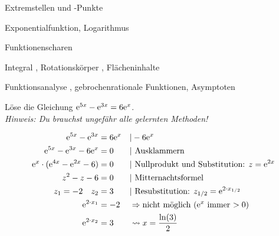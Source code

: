 


\begin{inhalt}
	\item Extremstellen und -Punkte 
	\item Exponentialfunktion, Logarithmus 
	\item Funktionenscharen 
  \item Integral , Rotationskörper , Flächeninhalte 
	\item Funktionsanalyse , gebrochenrationale Funktionen, Asymptoten 
\end{inhalt}

Löse die Gleichung $\mathrm{e}^{5x}-\mathrm{e}^{3x}=6\mathrm{e}^x$.\\
\textit{Hinweis: Du brauchst ungefähr alle gelernten Methoden!}
\begin{lsg}{}
	\begin{multicols}{2}
	\begin{align*}
		\e^{5x}-\e^{3x}&=6\e^x &&|-6\e^x\\
		\e^{5x}-\e^{3x}-6\e^x&=0 &&|\ \text{Ausklammern}\\
		\e^x\cdot(\e^{4x}-\e^{2x}-6)&=0 &&|\ \text{Nullprodukt und Substitution: } z=\e^{2x}\\
		z^2-z-6&=0 &&|\ \text{Mitternachtsformel}\\
		z_1=-2 \quad z_2&=3&&|\ \text{Resubstitution: } z_{1/2}=\e^{2\cdot x_{1/2}}\\
		\e^{2\cdot x_1}&=-2 &&\Rightarrow \text{nicht möglich ($\e^x$ immer $>0$)}\\
		\e^{2\cdot x_2}&= 3 &&\rightsquigarrow x=\frac{\ln(3)}{2}
	\end{align*}
	\end{multicols}
\end{lsg}



